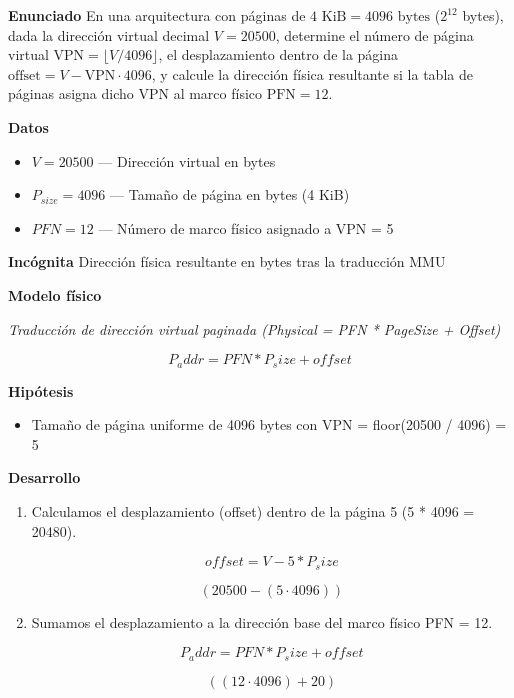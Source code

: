 \documentclass{book}
\begin{document}
\begin{tcolorbox}[title={Problema resuelto}, studiumworked, breakable]

\noindent\textbf{Enunciado}
En una arquitectura con páginas de \(4\text{ KiB} = 4096\text{ bytes}\) (\(2^{12}\) bytes), dada la dirección virtual decimal \(V = 20500\), determine el número de página virtual \(\text{VPN} = \lfloor V / 4096 \rfloor\), el desplazamiento dentro de la página \(\text{offset} = V - \text{VPN} \cdot 4096\), y calcule la dirección física resultante si la tabla de páginas asigna dicho VPN al marco físico \(\text{PFN} = 12\).

\noindent\textbf{Datos}
\begin{itemize}
\item $V = 20500$ — Dirección virtual en bytes
\item $P_{size} = 4096$ — Tamaño de página en bytes (4 KiB)
\item $PFN = 12$ — Número de marco físico asignado a VPN = 5
\end{itemize}

\noindent\textbf{Incógnita}
Dirección física resultante en bytes tras la traducción MMU

\noindent\textbf{Modelo físico}

\noindent\textit{Traducción de dirección virtual paginada (Physical = PFN * PageSize + Offset)}

\[
P_addr = PFN * P_size + offset
\]

\noindent\textbf{Hipótesis}
\begin{itemize}
\item Tamaño de página uniforme de 4096 bytes con VPN = floor(20500 / 4096) = 5
\end{itemize}

\noindent\textbf{Desarrollo}
\begin{enumerate}
\item
Calculamos el desplazamiento (offset) dentro de la página 5 (5 * 4096 = 20480).

\[
offset = V - 5 * P_size
\]

\[
\left(20500-\left(5\cdot 4096\right)\right)
\]
\item
Sumamos el desplazamiento a la dirección base del marco físico PFN = 12.

\[
P_addr = PFN * P_size + offset
\]

\[
\left(\left(12\cdot 4096\right)+20\right)
\]
\end{enumerate}


\end{tcolorbox}
\end{document}
